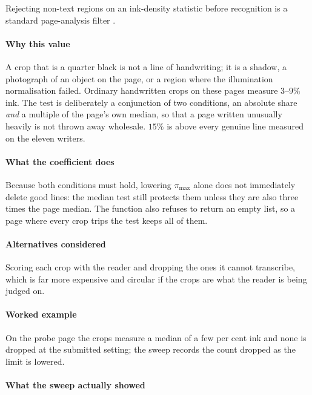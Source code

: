 Rejecting non-text regions on an ink-density statistic before recognition is a standard page-analysis filter \cite{shafait2008}.

\paragraph{Why this value}

A crop that is a quarter black is not a line of handwriting; it is a shadow, a photograph of an object on the page, or a region where the illumination normalisation failed. Ordinary handwritten crops on these pages measure $3$--$9\%$ ink. The test is deliberately a conjunction of two conditions, an absolute share \emph{and} a multiple of the page's own median, so that a page written unusually heavily is not thrown away wholesale. $15\%$ is above every genuine line measured on the eleven writers.

\paragraph{What the coefficient does}

Because both conditions must hold, lowering $\pi_{\max}$ alone does not immediately delete good lines: the median test still protects them unless they are also three times the page median. The function also refuses to return an empty list, so a page where every crop trips the test keeps all of them.

\paragraph{Alternatives considered}

Scoring each crop with the reader and dropping the ones it cannot transcribe, which is far more expensive and circular if the crops are what the reader is being judged on.

\paragraph{Worked example}

On the probe page the crops measure a median of a few per cent ink and none is dropped at the submitted setting; the sweep records the count dropped as the limit is lowered.

\paragraph{What the sweep actually showed}

